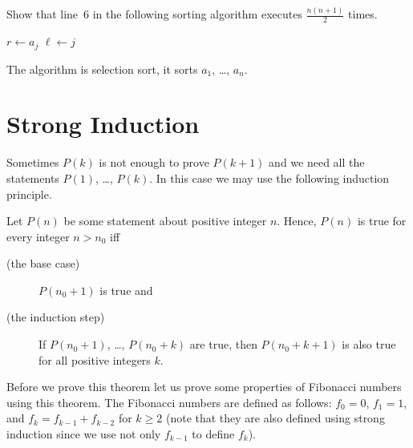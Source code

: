 \begin{exercise}
    Show that line~6 in the following sorting algorithm executes
    $\frac{n (n + 1)}{2}$ times.
    \begin{algorithm}
        \begin{algorithmic}[1]
                            \State $r \gets a_j$
                            \State $\ell \gets j$
                        \EndIf
                    \EndFor
                \EndFor
            \EndFunction
    \end{algorithmic}
    \caption{The algorithm is selection sort, it sorts $a_1$, \dots, $a_n$.}
  \end{algorithm}
\end{exercise}



\section{Strong Induction}

Sometimes $P(k)$ is not enough to prove $P(k + 1)$ and we need all the
statements $P(1)$, \dots, $P(k)$. In this case we may use the following
induction  principle.

\begin{theorem}
\label{theorem:strong-induction}
    Let $P(n)$ be some statement about positive integer $n$.
    Hence, $P(n)$ is true for every integer $n > n_0$ iff
    \begin{description}
        \item [(the base case)] $P(n_0 + 1)$ is true and
        \item [(the induction step)] If $P(n_0 + 1)$, \dots, $P(n_0 + k)$ are true,
            then $P(n_0 + k + 1)$ is also true for all positive integers $k$.
  \end{description}
\end{theorem}

Before we prove this theorem let us prove some properties of Fibonacci numbers
using this theorem. The Fibonacci numbers are defined as follows:
$f_0 = 0$, $f_1 = 1$, and $f_k = f_{k - 1} + f_{k - 2}$ for $k \ge 2$ (note
that they are also defined using strong induction since we use not only
$f_{k - 1}$ to define $f_k$).

